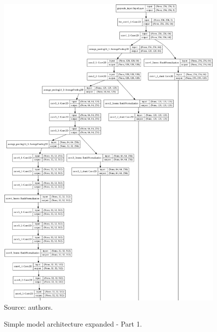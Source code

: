 \documentclass[12pt,openright,oneside,a4paper,english, brazilian]{abntex2}
\begin{document}
\begin{otherlanguage}{english}
\begin{figure}[!htb]
\centering
\caption{Simple model architecture expanded - Part 1.}
\includegraphics[height = \textheight - 1.5cm]{model_plot/Simple1}
Source: authors.
\label{simple_plot_1}
\end{figure}


\end{otherlanguage}
\end{document}

